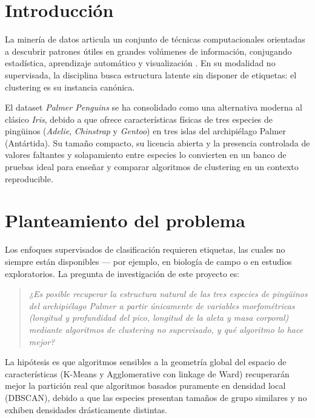 \section{Introducción}

La minería de datos articula un conjunto de técnicas computacionales orientadas a descubrir patrones útiles en grandes volúmenes de información, conjugando estadística, aprendizaje automático y visualización \citep{hankamber2011data,witten2016data}. En su modalidad no supervisada, la disciplina busca estructura latente sin disponer de etiquetas: el clustering es su instancia canónica.

El dataset \emph{Palmer Penguins} \citep{horst2020palmer,gorman2014ecological} se ha consolidado como una alternativa moderna al clásico \emph{Iris}, debido a que ofrece características físicas de tres especies de pingüinos (\emph{Adelie}, \emph{Chinstrap} y \emph{Gentoo}) en tres islas del archipiélago Palmer (Antártida). Su tamaño compacto, su licencia abierta y la presencia controlada de valores faltantes y solapamiento entre especies lo convierten en un banco de pruebas ideal para enseñar y comparar algoritmos de clustering en un contexto reproducible.

\section{Planteamiento del problema}

Los enfoques supervisados de clasificación requieren etiquetas, las cuales no siempre están disponibles --- por ejemplo, en biología de campo o en estudios exploratorios. La pregunta de investigación de este proyecto es:

\begin{quote}
\emph{¿Es posible recuperar la estructura natural de las tres especies de pingüinos del archipiélago Palmer a partir únicamente de variables morfométricas (longitud y profundidad del pico, longitud de la aleta y masa corporal) mediante algoritmos de clustering no supervisado, y qué algoritmo lo hace mejor?}
\end{quote}

La hipótesis es que algoritmos sensibles a la geometría global del espacio de características (K-Means y Agglomerative con linkage de Ward) recuperarán mejor la partición real que algoritmos basados puramente en densidad local (DBSCAN), debido a que las especies presentan tamaños de grupo similares y no exhiben densidades drásticamente distintas.

